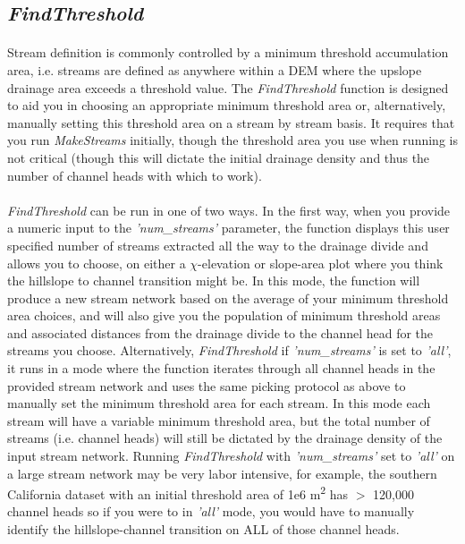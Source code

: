 \subsection{\textit{FindThreshold}} \label{sec:FindThresh}

\paragraph{}Stream definition is commonly controlled by a minimum threshold accumulation area, i.e. streams are defined as anywhere within a DEM where the upslope drainage area exceeds a threshold value. The \textit{FindThreshold} function is designed to aid you in choosing an appropriate minimum threshold area or, alternatively, manually setting this threshold area on a stream by stream basis. It requires that you run \textit{MakeStreams} initially, though the threshold area you use when running  is not critical (though this will dictate the initial drainage density and thus the number of channel heads with which to work). 

\paragraph{}\textit{FindThreshold} can be run in one of two ways. In the first way, when you provide a numeric input to the \textit{'num\_streams'} parameter, the function displays this user specified number of streams extracted all the way to the drainage divide and allows you to choose, on either a $\chi$-elevation or slope-area plot where you think the hillslope to channel transition might be. In this mode, the function will produce a new stream network based on the average of your minimum threshold area choices, and will also give you the population of minimum threshold areas and associated distances from the drainage divide to the channel head for the streams you choose. Alternatively, \textit{FindThreshold} if \textit{'num\_streams'} is set to \textit{'all'}, it runs in a mode where the function iterates through all channel heads in the provided stream network and uses the same picking protocol as above to manually set the minimum threshold area for each stream. In this mode each stream will have a variable minimum threshold area, but the total number of streams (i.e. channel heads) will still be dictated by the drainage density of the input stream network. Running \textit{FindThreshold} with \textit{'num\_streams'} set to \textit{'all'} on a large stream network may be very labor intensive, for example, the southern California dataset with an initial threshold area of 1e6 m\textsuperscript{2} has $>$ 120,000 channel heads so if you were to in \textit{'all'} mode, you would have to manually identify the hillslope-channel transition on ALL of those channel heads.

